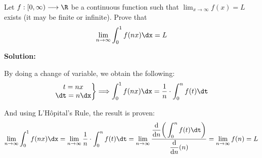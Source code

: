\documentclass[../../main.tex]{subfiles}
\begin{document}
  \begin{shaded}
    Let $f: [0, \infty) \longrightarrow \R$ be a continuous function such that $\displaystyle\lim_{x \to \infty} f(x) = L$ exists (it may be finite or infinite). Prove that
    $$
    \lim_{n \to \infty} \int_0^1 f(nx) \dx = L
    $$
  \end{shaded}

  \textbf{Solution:}

  By doing a change of variable, we obtain the following:
  $$
  \left .
    \begin{matrix}
      t = nx \\
      \dt = n \dx
    \end{matrix}
  \right \}
  \Longrightarrow
  \int_0^1 f(nx) \dx = \frac{1}{n} \cdot \int_0^n f(t) \dt
  $$

  And using L'Hôpital's Rule, the result is proven:
  $$
  \lim_{n \to \infty} \int_0^1 f(nx) \dx = \lim_{n \to \infty} \frac{1}{n} \cdot \int_0^n f(t) \dt = \lim_{n \to \infty} \frac{\displaystyle\frac{\mathrm{d}}{\mathrm{d}n}\bigg(\displaystyle\int_0^n f(t) \dt\bigg)}{\displaystyle\frac{\mathrm{d}}{\mathrm{d}n}(n)} = \lim_{n \to \infty} f(n) = L
  $$
\end{document}

